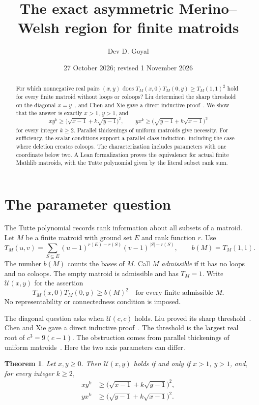 \documentclass[11pt,a4paper]{article}
\title{The exact asymmetric Merino--Welsh region for finite matroids}
\author{Dev D. Goyal}
\date{27 October 2026; revised 1 November 2026}
\newtheorem{theorem}{Theorem}
\newcommand{\U}{\mathcal U}
\begin{document}
\maketitle

\begin{abstract}
For which nonnegative real pairs $(x,y)$ does
$T_M(x,0)T_M(0,y)\geq T_M(1,1)^2$ hold for every finite matroid without
loops or coloops? Liu determined the sharp threshold on the diagonal
$x=y$~\cite{Liu}, and Chen and Xie gave a direct inductive
proof~\cite{CX}. We show that the answer is exactly $x>1$, $y>1$, and
\[
xy^k\geq\bigl(\sqrt{x-1}+k\sqrt{y-1}\bigr)^2,
\qquad
yx^k\geq\bigl(\sqrt{y-1}+k\sqrt{x-1}\bigr)^2
\]
for every integer $k\geq2$. Parallel thickenings of uniform matroids give
necessity. For sufficiency, the scalar conditions support a
parallel-class induction, including the case where deletion creates coloops.
The characterization includes parameters with one coordinate below two.
A Lean formalization proves the equivalence for actual finite Mathlib
matroids, with the Tutte polynomial given by the literal subset rank sum.
\end{abstract}

\section{The parameter question}

The Tutte polynomial records rank information about all subsets of a matroid.
Let $M$ be a finite matroid with ground set $E$ and rank function $r$. Use
\[
T_M(u,v)=\sum_{S\subseteq E}(u-1)^{r(E)-r(S)}(v-1)^{|S|-r(S)},
\qquad b(M)=T_M(1,1).
\]
The number $b(M)$ counts the bases of $M$. Call $M$ \emph{admissible} if it
has no loops and no coloops. The empty matroid is admissible and has
$T_M=1$. Write $\U(x,y)$ for the assertion
\begin{equation}\label{eq:universal}
T_M(x,0)T_M(0,y)\geq b(M)^2
\quad\text{for every finite admissible }M.
\end{equation}
No representability or connectedness condition is imposed.

The diagonal question asks when $\U(c,c)$ holds. Liu proved its sharp
threshold~\cite{Liu}. Chen and Xie gave a direct inductive proof~\cite{CX}.
The threshold is the largest real root of $c^3=9(c-1)$. The obstruction
comes from parallel thickenings of uniform matroids~\cite{BCCP}.
Here the two axis parameters can differ.

\begin{theorem}\label{thm:main}
Let $x,y\geq0$. Then $\U(x,y)$ holds if and only if $x>1$, $y>1$, and,
for every integer $k\geq2$,
\begin{align}
xy^k&\geq\bigl(\sqrt{x-1}+k\sqrt{y-1}\bigr)^2,\label{eq:forward}\\
yx^k&\geq\bigl(\sqrt{y-1}+k\sqrt{x-1}\bigr)^2.\label{eq:reverse}
\end{align}
\end{theorem}
\end{document}
